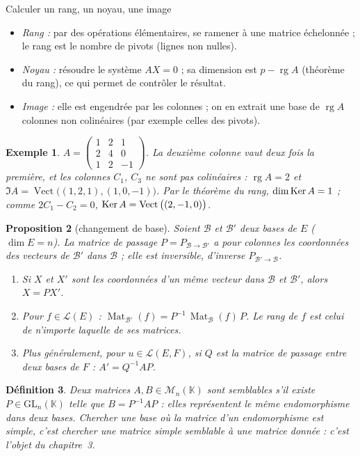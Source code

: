 \documentclass[a4paper,11pt]{article}
\numberwithin{equation}{section}
\numberwithin{figure}{section}
\numberwithin{table}{section}
\theoremstyle{enonce}
\newtheorem{definition}{Définition}[section]
\newtheorem{proposition}[definition]{Proposition}
\theoremstyle{exemple}
\newtheorem{exemple}[definition]{Exemple}
\theoremstyle{remarque}
\newcommand{\K}{\mathbb{K}}
\newcommand{\Mn}[1]{\mathcal{M}_{n}(#1)}
\newcommand{\GLn}[1]{\mathrm{GL}_n(#1)}
\newcommand{\LE}{\mathcal{L}(E)}
\newcommand{\rg}{\operatorname{rg}}
\newcommand{\vect}{\operatorname{Vect}}
\newcommand{\Mat}{\operatorname{Mat}}
\begin{document}
\begin{methode}{Calculer un rang, un noyau, une image}\label{m:rang}
\begin{itemize}
\item \emph{Rang :} par des opérations élémentaires, se ramener à une matrice échelonnée ; le rang est le nombre de pivots
(lignes non nulles).
\item \emph{Noyau :} résoudre le système $AX=0$ ; sa dimension est $p-\rg A$ (théorème du rang), ce qui permet de contrôler le
résultat.
\item \emph{Image :} elle est engendrée par les colonnes ; on en extrait une base de $\rg A$ colonnes non colinéaires
(par exemple celles des pivots).
\end{itemize}
\end{methode}

\begin{exemple}
$A=\begin{pmatrix}1&2&1\\2&4&0\\1&2&-1\end{pmatrix}$. La deuxième colonne vaut deux fois la première, et les colonnes $C_1$, $C_3$
ne sont pas colinéaires : $\rg A=2$ et $\Im A=\vect\big((1,2,1),(1,0,-1)\big)$. Par le théorème du rang, $\dim\operatorname{Ker} A=1$ ; comme
$2C_1-C_2=0$, $\Ker A=\vect\big((2,-1,0)\big)$.
\end{exemple}

\begin{proposition}[changement de base]\label{p:chgt}
Soient $\mathcal B$ et $\mathcal B'$ deux bases de $E$ ($\dim E=n$). La matrice de passage $P=P_{\mathcal B\to\mathcal B'}$ a pour
colonnes les coordonnées des vecteurs de $\mathcal B'$ dans $\mathcal B$ ; elle est inversible, d'inverse $P_{\mathcal B'\to\mathcal B}$.
\begin{enumerate}
\item Si $X$ et $X'$ sont les coordonnées d'un même vecteur dans $\mathcal B$ et $\mathcal B'$, alors $X=PX'$.
\item Pour $f\in\LE$ : $\Mat_{\mathcal B'}(f)=P^{-1}\,\Mat_{\mathcal B}(f)\,P$. Le rang de $f$ est celui de n'importe laquelle de ses
matrices.
\item Plus généralement, pour $u\in\mathcal L(E,F)$, si $Q$ est la matrice de passage entre deux bases de $F$ :
$A'=Q^{-1}AP$.
\end{enumerate}
\end{proposition}

\begin{definition}
Deux matrices $A,B\in\Mn{\K}$ sont \emph{semblables} s'il existe $P\in\GLn{\K}$ telle que $B=P^{-1}AP$ : elles représentent le
même endomorphisme dans deux bases. Chercher une base où la matrice d'un endomorphisme est simple, c'est chercher une matrice
simple semblable à une matrice donnée : c'est l'objet du chapitre~3.
\end{definition}
\end{document}
